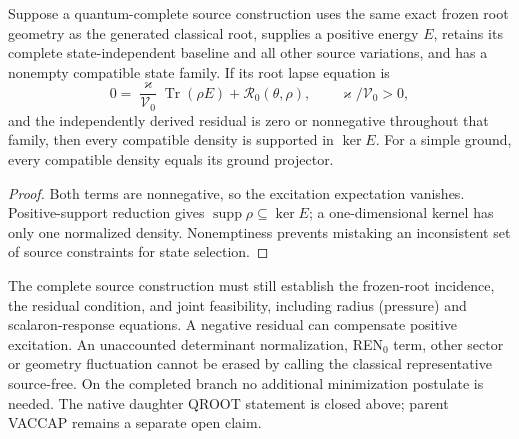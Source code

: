 \documentclass[12pt,a4paper]{article}
\begin{document}
\begin{theorem}
\label{p8:thm:v2109-fixed-root-budget}
Suppose a quantum-complete source construction uses the same exact frozen
root geometry as the generated classical root, supplies a positive energy
\(E\), retains its complete state-independent baseline and all other
source variations, and has a nonempty compatible state family.  If its
root lapse equation is
\[
 0=\frac{\varkappa}{\mathcal V_0}\operatorname{Tr}(\rho E)
          +\mathcal R_0(\theta,\rho),\qquad
 \varkappa/\mathcal V_0>0,
\]
and the independently derived residual is zero or nonnegative throughout
that family, then every compatible density is supported in \(\ker E\).
For a simple ground, every compatible density equals its ground projector.
\end{theorem}
\begin{proof}
Both terms are nonnegative, so the excitation expectation vanishes.
Positive-support reduction gives
\(\operatorname{supp}\rho\subseteq\ker E\); a one-dimensional kernel
has only one normalized density.  Nonemptiness prevents mistaking an
inconsistent set of source constraints for state selection.
\end{proof}
The complete source construction must still establish the frozen-root
incidence, the residual condition, and joint feasibility, including radius
(pressure) and scalaron-response equations.  A negative residual can
compensate positive excitation.  An unaccounted determinant normalization,
REN$_0$ term, other sector or geometry fluctuation cannot be erased by
calling the classical representative source-free.  On the completed branch no additional minimization postulate is needed.  The native daughter QROOT statement is closed above; parent VACCAP remains a separate open claim.
\end{document}
